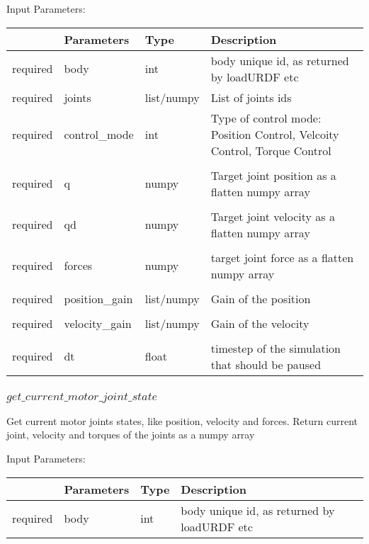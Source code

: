 \documentclass[
	ngerman,
	accentcolor=9c,%
	type=intern,
	marginpar=false
	]{tudapub}
\begin{document}
\vspace{0.5cm}
\noindent Input Parameters:
\vspace{0.5cm}

\begin{tabular}{|p{}|p{}|p{}| p{}|}
\hline
 & \textbf{Parameters} & \textbf{Type} & \textbf{Description} \\
\hline
required & body & int  & body unique id, as returned by loadURDF etc\\
\hline
required & joints & list/numpy  & List of joints ids \\
\hline
required & control\_mode & int  & Type of control mode: Position Control, Velcoity Control, Torque Control\\
\hline\\
required & q & numpy & Target joint position as a flatten numpy array\\
\hline\\
required & qd & numpy & Target joint velocity as a flatten numpy array\\
\hline\\
required & forces & numpy & target joint force as a flatten numpy array\\
\hline\\
required & position\_gain & list/numpy  & Gain of the position\\
\hline\\
required & velocity\_gain & list/numpy  & Gain of the velocity\\
\hline\\
required & dt & float  & timestep of the simulation that should be paused\\
\hline
\end{tabular}
\vspace{0.5cm}



\subsubsection{$get\_current\_motor\_joint\_state$}
\noindent Get current motor joints states, like position, velocity and forces. Return current joint, velocity and torques of the joints as a numpy array


\vspace{0.5cm}
\noindent Input Parameters:
\vspace{0.5cm}

\begin{tabular}{|p{}|p{}|p{}| p{}|}
\hline
 & \textbf{Parameters} & \textbf{Type} & \textbf{Description} \\
\hline
required & body & int  & body unique id, as returned by loadURDF etc\\
\hline
\end{tabular}
\vspace{0.5cm}
\end{document}
